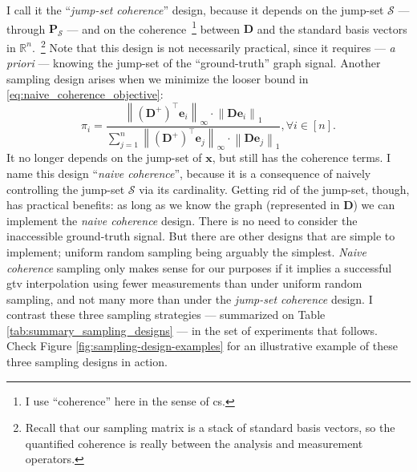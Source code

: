 I call it the ``\emph{jump-set coherence}'' design, because it depends on the jump-set $\mathcal{S}$ --- through $\mathbf{P}_{\mathcal{S}}$ --- and on the coherence~\footnote{I use ``coherence'' here in the sense of \acrlong{cs}.} between $\mathbf{D}$ and the standard basis vectors in $\mathbb{R}^{n}$.~\footnote{Recall that our sampling matrix is a stack of standard basis vectors, so the quantified coherence is really between the analysis and measurement operators.} Note that this design is not necessarily practical, since it requires --- \emph{a priori} --- knowing the jump-set of the ``ground-truth'' graph signal. Another sampling design arises when we minimize the looser bound in \eqref{eq:naive_coherence_objective}:
\begin{equation}
    \pi_i = \frac{\left \| (\mathbf{D}^{+})^{\top} \mathbf{e}_{i} \right \|_{\infty} \cdot \left \| \mathbf{D} \mathbf{e}_{i} \right \|_{1}}{\sum_{j=1}^{n} \left \| (\mathbf{D}^{+})^{\top} \mathbf{e}_{j} \right \|_{\infty} \cdot \left \| \mathbf{D} \mathbf{e}_{j} \right \|_{1}}, \forall i \in [n].
    \label{eq:naive_coherence_probabilities}
\end{equation}
It no longer depends on the jump-set of $\mathbf{x}$, but still has the coherence terms. I name this design ``\emph{naive coherence}'', because it is a consequence of naively controlling the jump-set $\mathcal{S}$ via its cardinality. Getting rid of the jump-set, though, has practical benefits: as long as we know the graph (represented in $\mathbf{D}$) we can implement the \emph{naive coherence} design. There is no need to consider the inaccessible ground-truth signal. But there are other designs that are simple to implement; uniform random sampling being arguably the simplest. \emph{Naive coherence} sampling only makes sense for our purposes if it implies a successful \acrshort{gtv} interpolation using fewer measurements than under uniform random sampling, and not many more than under the \emph{jump-set coherence} design. I contrast these three sampling strategies --- summarized on Table \ref{tab:summary_sampling_designs} --- in the set of experiments that follows. Check Figure \ref{fig:sampling-design-examples} for an illustrative example of these three sampling designs in action.

